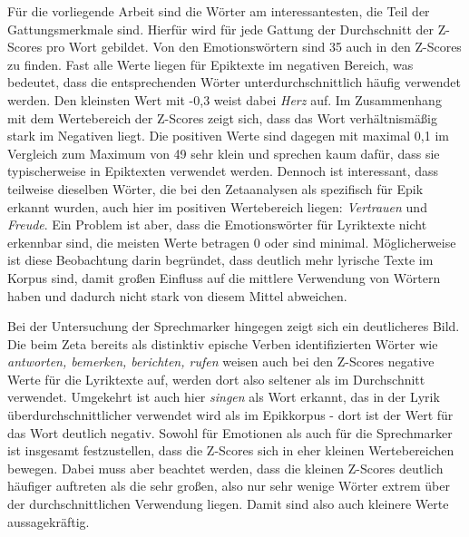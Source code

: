 \documentclass[a4paper,10p]{article}
\begin{document}
Für die vorliegende Arbeit sind die Wörter am interessantesten, die Teil der Gattungsmerkmale sind. Hierfür wird für jede Gattung der Durchschnitt der Z-Scores pro Wort gebildet. Von den Emotionswörtern sind 35 auch in den Z-Scores zu finden. Fast alle Werte liegen für Epiktexte im negativen Bereich, was bedeutet, dass die entsprechenden Wörter unterdurchschnittlich häufig verwendet werden. Den kleinsten Wert mit -0,3 weist dabei \textit{Herz} auf. Im Zusammenhang mit dem Wertebereich der Z-Scores zeigt sich, dass das Wort verhältnismäßig stark im Negativen liegt. Die positiven Werte sind dagegen mit maximal 0,1 im Vergleich zum Maximum von 49 sehr klein und sprechen kaum dafür, dass sie typischerweise in Epiktexten verwendet werden. Dennoch ist interessant, dass teilweise dieselben Wörter, die bei den Zetaanalysen als spezifisch für Epik erkannt wurden, auch hier im positiven Wertebereich liegen: \textit{Vertrauen} und \textit{Freude}. Ein Problem ist aber, dass die Emotionswörter für Lyriktexte nicht erkennbar sind, die meisten Werte betragen 0 oder sind minimal. Möglicherweise ist diese Beobachtung darin begründet, dass deutlich mehr lyrische Texte im Korpus sind, damit großen Einfluss auf die mittlere Verwendung von Wörtern haben und dadurch nicht stark von diesem Mittel abweichen. \par 

Bei der Untersuchung der Sprechmarker hingegen zeigt sich ein deutlicheres Bild. Die beim Zeta bereits als distinktiv epische Verben identifizierten Wörter wie \textit{antworten, bemerken, berichten, rufen} weisen auch bei den Z-Scores negative Werte für die Lyriktexte auf, werden dort also seltener als im Durchschnitt verwendet. Umgekehrt ist auch hier \textit{singen} als Wort erkannt, das in der Lyrik überdurchschnittlicher verwendet wird als im Epikkorpus - dort ist der Wert für das Wort deutlich negativ. Sowohl für Emotionen als auch für die Sprechmarker ist insgesamt festzustellen, dass die Z-Scores sich in eher kleinen Wertebereichen bewegen. Dabei muss aber beachtet werden, dass die kleinen Z-Scores deutlich häufiger auftreten als die sehr großen, also nur sehr wenige Wörter extrem über der durchschnittlichen Verwendung liegen. Damit sind also auch kleinere Werte aussagekräftig. \par 
\end{document}

